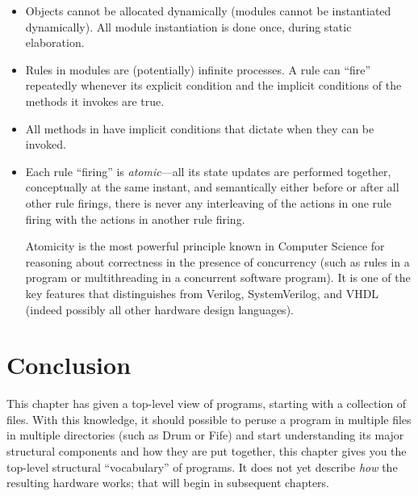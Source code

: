 \begin{itemize}

 \item Objects cannot be allocated dynamically (modules cannot be
       instantiated dynamically).  All module instantiation is done
       once, during static elaboration.

 \item Rules in {\BSV} modules are (potentially) infinite processes.  A
       rule can ``fire'' repeatedly whenever its explicit condition
       and the implicit conditions of the methods it invokes are true.

 \item All methods in {\BSV} have implicit conditions that dictate when
       they can be invoked.

 \item Each rule ``firing'' is \emph{atomic}---all its state updates
       are performed together, conceptually at the same instant, and
       semantically either before or after all other rule firings,
       {\ie} there is never any interleaving of the actions in one
       rule firing with the actions in another rule firing.

       Atomicity is the most powerful principle known in Computer
       Science for reasoning about correctness in the presence of
       concurrency (such as rules in a {\BSV} program or multithreading
       in a concurrent software program).  It is one of the key
       features that distinguishes {\BSV} from Verilog, SystemVerilog,
       and VHDL (indeed possibly all other hardware design languages).

\end{itemize}


\section{Conclusion}

This chapter has given a top-level view of {\BSV} programs, starting with
a collection of files.  With this knowledge, it should possible to
peruse a {\BSV} program in multiple files in multiple directories (such
as Drum or Fife) and start understanding its major structural
components and how they are put together, {\ie} this chapter gives you
the top-level structural ``vocabulary'' of {\BSV} programs.  It does not
yet describe \emph{how} the resulting hardware works; that will begin
in subsequent chapters.

